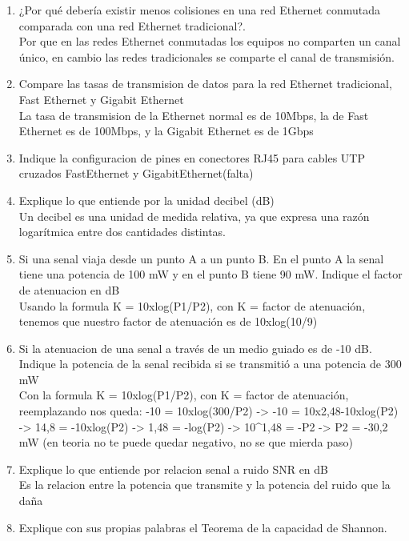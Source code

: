 \documentclass{udparticle}
\begin{document}
\begin{enumerate}
    \item ¿Por qué debería existir menos colisiones en una red Ethernet conmutada comparada con una red Ethernet tradicional?.\\
    Por que en las redes Ethernet conmutadas los equipos no comparten un canal único, en cambio las redes tradicionales se comparte el
    canal de transmisión. \\
    \item Compare las tasas de transmision de datos para la red Ethernet tradicional, Fast Ethernet y Gigabit Ethernet\\
    La tasa de transmision de la Ethernet normal es de 10Mbps, la de Fast Ethernet es de 100Mbps, y la Gigabit Ethernet es de 1Gbps\\
    \item Indique la conﬁguracion de pines en conectores RJ45 para cables UTP cruzados FastEthernet y GigabitEthernet(falta)\\
    \item  Explique lo que entiende por la unidad decibel (dB)\\
    Un decibel es una unidad de medida relativa, ya que expresa una razón logarítmica entre dos cantidades distintas.\\
    \item Si una senal viaja desde un punto A a un punto B. En el punto A la senal tiene una potencia de 100 mW y en el punto B tiene
    90 mW. Indique el factor de atenuacion en dB\\
    Usando la formula K = 10xlog(P1/P2), con K = factor de atenuación, tenemos que nuestro factor de atenuación es de 10xlog(10/9)
    \item Si la atenuacion de una senal a través de un medio guiado es de -10 dB. Indique la potencia de la senal recibida si se
    transmitió a una potencia de 300 mW\\
    Con la formula K = 10xlog(P1/P2), con K = factor de atenuación, reemplazando nos queda: -10 = 10xlog(300/P2)
    -> -10 = 10x2,48-10xlog(P2) -> 14,8 = -10xlog(P2) -> 1,48 = -log(P2) -> 10^1,48 = -P2 -> P2 = -30,2 mW (en teoria no te puede
    quedar negativo, no se que mierda paso)
    \item Explique lo que entiende por relacion senal a ruido SNR en dB\\
    Es la relacion entre la potencia que transmite y la potencia del ruido que la daña\\
    \item  Explique con sus propias palabras el Teorema de la capacidad de Shannon. \\

\end{enumerate}
\end{document}
